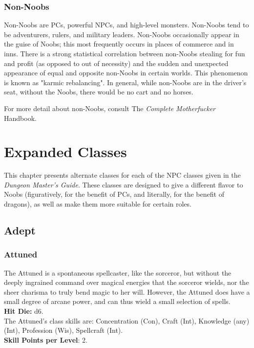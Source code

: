 \documentclass[11pt]{report}
\begin{document}
\subsection{Non-Noobs}
Non-Noobs are PCs, powerful NPCs, and high-level monsters. Non-Noobs tend to be
adventurers, rulers, and military leaders. Non-Noobs occasionally appear in the
guise of Noobs; this most frequently occurs in places of commerce and in inns.
There is a strong statistical correlation between non-Noobs stealing for fun and
profit (as opposed to out of necessity) and the sudden and unexpected appearance
of equal and opposite non-Noobs in certain worlds. This phenomenon is known as
"karmic rebalancing". In general, while non-Noobs are in the driver's seat,
without the Noobs, there would be no cart and no horses.

For more detail about non-Noobs, consult The \textit{Complete Motherfucker}
Handbook.

\chapter{Expanded Classes}
This chapter presents alternate classes for each of the NPC classes given in the
\textit{Dungeon Master's Guide}. These classes are designed to give a different
flavor to Noobs (figuratively, for the benefit of PCs, and literally, for the
benefit of dragons), as well as make them more suitable for certain roles.

\section{Adept}
\subsection{Attuned}
The Attuned is a spontaneous spellcaster, like the sorceror, but without the
deeply ingrained command over magical energies that the sorceror wields, nor the
sheer charisma to truly bend magic to her will. However, the Attuned does have
a small degree of arcane power, and can thus wield a small selection of spells.
\\
\textbf{Hit Die:} d6. \\
The Attuned's class skills are: Concentration (Con), Craft (Int), Knowledge
(any) (Int), Profession (Wis), Spellcraft (Int). \\
\textbf{Skill Points per Level}: 2.
\end{document}
